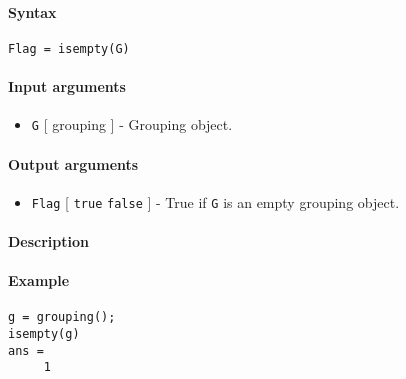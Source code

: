 


	\paragraph{Syntax}

\begin{verbatim}
Flag = isempty(G)
\end{verbatim}

\paragraph{Input arguments}

\begin{itemize}
\itemsep1pt\parskip0pt
\item
  \texttt{G} {[} grouping {]} - Grouping object.
\end{itemize}

\paragraph{Output arguments}

\begin{itemize}
\itemsep1pt\parskip0pt
\item
  \texttt{Flag} {[} \texttt{true} \textbar{} \texttt{false} {]} - True
  if \texttt{G} is an empty grouping object.
\end{itemize}

\paragraph{Description}

\paragraph{Example}

\begin{verbatim}
g = grouping();
isempty(g)
ans = 
     1
\end{verbatim}


